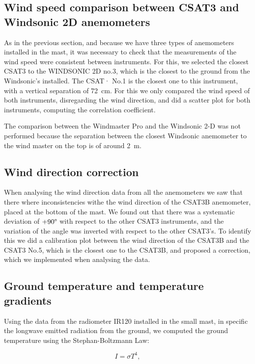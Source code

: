 \subsection{Wind speed comparison between CSAT3 and Windsonic 2D anemometers}

As in the previous section, and because we have three types of anemometers installed in the mast, it was necessary to check that the measurements of the wind speed were consistent between instruments. For this, we selected the closest CSAT3 to the WINDSONIC 2D no.3, which is the closest to the ground from the Windsonic's installed. The CSAT· No.1 is the closest one to this instrument, with a vertical separation of 72~cm. For this we only compared the wind speed of both instruments, disregarding the wind direction, and did a scatter plot for both instruments, computing the correlation coefficient. 

The comparison between the Windmaster Pro and the Windsonic 2-D was not performed because the separation between the closest Windsonic anemometer to the wind master on the top is of around 2~m. 

\subsection{Wind direction correction}

When analysing the wind direction data from all the anemometers we saw that there where inconsistencies withe the wind direction of the CSAT3B anemometer, placed at the bottom of the mast. We found out that there was a systematic deviation of $+90\degree$ with respect to the other CSAT3 instruments, and the variation of the angle was inverted with respect to the other CSAT3's. To identify this we did a calibration plot between the wind direction of the CSAT3B and the CSAT3 No.5, which is the closest one to the CSAT3B, and proposed a correction, which we implemented when analysing the data.

\subsection{Ground temperature and temperature gradients}

Using the data from the radiometer IR120 installed in the small mast, in specific the longwave emitted radiation from the ground, we computed the ground temperature using the Stephan-Boltzmann Law:

\begin{equation}
    I = \sigma T^4, 
\end{equation}

